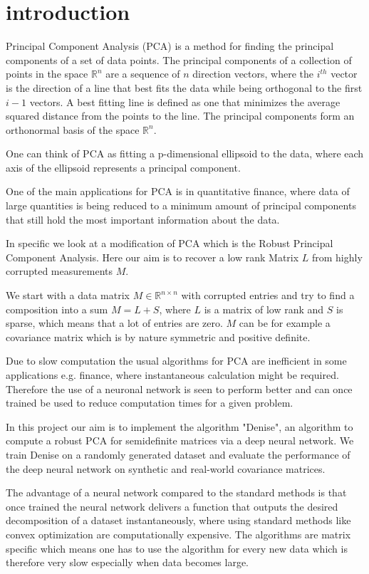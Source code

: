 \section{introduction}

Principal Component Analysis (PCA) is a method for finding the principal components of a set of data points. The principal components of a collection of points in the space $\mathbb{R}^n$ are a sequence of $n$ direction vectors, where the $i^{th}$ vector is the direction of a line that best fits the data while being orthogonal to the first $i-1$ vectors. A best fitting line is defined as one that minimizes the average squared distance from the points to the line. The principal components form an orthonormal basis of the space $\mathbb{R}^n$.

One can think of PCA as fitting a p-dimensional ellipsoid to the data, where each axis of the ellipsoid represents a principal component.

One of the main applications for PCA is in quantitative finance, where data of large quantities is being reduced to a minimum amount of principal components that still hold the most important information about the data. 

In specific we look at a modification of PCA which is the Robust Principal Component Analysis. Here our aim is to recover a low rank Matrix $L$ from highly corrupted measurements $M$.

We start with a data matrix $M \in \mathbb{R}^{n \times n}$ with corrupted entries and try to find a composition into a sum $M = L + S$, where $L$ is a matrix of low rank and $S$ is sparse, which means that a lot of entries are zero. $M$ can be for example a covariance matrix which is by nature symmetric and positive definite.

Due to slow computation the usual algorithms for PCA are inefficient in some applications e.g. finance, where instantaneous calculation might be required. Therefore the use of a neuronal network is seen to perform better and can once trained be used to reduce computation times for a given problem.

In this project our aim is to implement the algorithm "Denise", an algorithm to compute a robust PCA for semidefinite matrices via a deep neural network. We train Denise on a randomly generated dataset and evaluate the performance of the deep neural network on synthetic and real-world covariance matrices.

The advantage of a neural network compared to the standard methods is that once trained the neural network delivers a function that outputs the desired decomposition of a dataset instantaneously, where using standard methods like convex optimization are computationally expensive. The algorithms are matrix specific which means one has to use the algorithm for every new data which is therefore very slow especially when data becomes large. 

